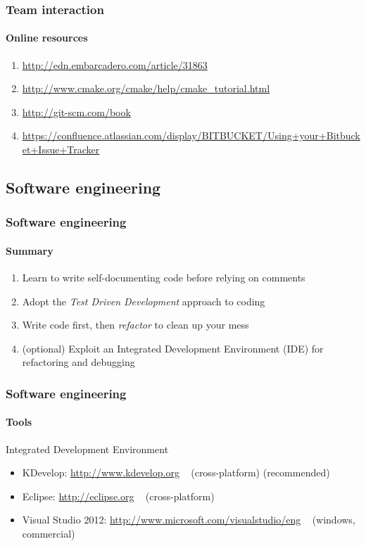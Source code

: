 \begin{frame}
\frametitle{Team interaction}
\framesubtitle{Online resources}
\begin{enumerate}
\item \url{http://edn.embarcadero.com/article/31863}
\item \url{http://www.cmake.org/cmake/help/cmake_tutorial.html}
\item \url{http://git-scm.com/book}
\item \url{https://confluence.atlassian.com/display/BITBUCKET/Using+your+Bitbucket+Issue+Tracker}
\end{enumerate}
\end{frame}

\subsection{Software engineering}

\begin{frame}
\frametitle{Software engineering}
\framesubtitle{Summary}

\begin{enumerate}
\item Learn to write self-documenting code before relying on comments
\item Adopt the {\em Test Driven Development} approach to coding
\item Write code first, then {\em refactor} to clean up your mess
\item (optional) Exploit an Integrated Development Environment (IDE) for refactoring and debugging
\end{enumerate}

\end{frame}

\begin{frame}
\frametitle{Software engineering}
\framesubtitle{Tools}
\begin{block}{Integrated Development Environment}
\begin{itemize}
\item KDevelop: \url{http://www.kdevelop.org} \,\,\, (cross-platform) (recommended)
\item Eclipse: \url{http://eclipse.org} \,\,\, (cross-platform)
\item Visual Studio 2012: \url{http://www.microsoft.com/visualstudio/eng} \,\,\, (windows, commercial)
\end{itemize}
\end{block}
\end{frame}


